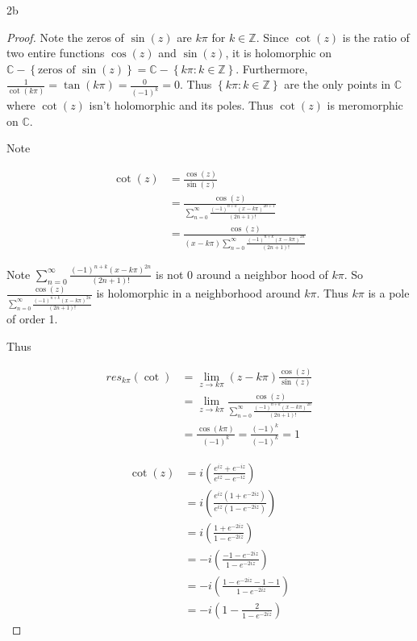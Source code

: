 \documentclass{article}
\newcommand{\C}{\mathbb{C}}
\newcommand{\Z}{\mathbb{Z}}
\begin{document}
\begin{PROB}{2b}\label{Problem 2b.}
\end{PROB}
\begin{proof}
    Note the zeros of $\sin(z)$ are $k \pi$ for $k \in \Z$. Since $\cot(z)$ is the ratio of two entire functions $\cos(z)$ and $\sin(z)$, it is holomorphic on $\C - \left\{ \text{zeros of }  \sin(z)\right\} = \C - \left\{ k \pi : k \in \Z \right\}$. Furthermore, $\frac{1}{\cot(k \pi)} = \tan(k \pi) = \frac{0}{(-1)^k} = 0$. Thus $\left\{ k \pi : k \in \Z \right\}$ are the only points in $\C$  where $\cot(z)$ isn't holomorphic and its poles. Thus $\cot(z)$ is meromorphic on $\C$. 
    
    Note 

    \begin{align*}
        \cot(z) &= \frac{\cos(z)}{\sin(z)} \\
        &=  \frac{\cos(z)}{\sum_{n = 0}^{\infty} \frac{(-1)^{n + k}(x - k \pi)^{2n + 1}}{(2n + 1)!}} \\
        &= \frac{\cos(z)}{(x - k \pi) \sum_{n = 0}^{\infty} \frac{(-1)^{n + k}(x - k \pi)^{2n}}{(2n + 1)!}} 
    \end{align*}

    Note $\sum_{n = 0}^{\infty} \frac{(-1)^{n + k}(x - k \pi)^{2n}}{(2n + 1)!}$ is not 0 around a neighbor hood of $k \pi$. So $\frac{\cos(z)}{\sum_{n = 0}^{\infty} \frac{(-1)^{n + k}(x - k \pi)^{2n}}{(2n + 1)!}}$ is holomorphic in a neighborhood around $k \pi$.   Thus $k \pi$ is a pole of order 1.
    
    Thus 

    \begin{align*}
        res_{k \pi}(\cot) &= \lim_{z \to k \pi}(z - k \pi)\frac{\cos(z)}{\sin(z)} \\
        &= \lim_{z \to k \pi} \frac{\cos(z)}{\sum_{n = 0}^{\infty} \frac{(-1)^{n + k}(x - k \pi)^{2n}}{(2n + 1)!}} \\
        &= \frac{\cos(k \pi)}{(-1)^k} = \frac{(-1)^k}{(-1)^k} = 1
    \end{align*}


    \begin{align*}
        \cot(z) &= i\left(\frac{e^{i z} + e^{-iz}}{e^{iz} - e^{-iz}}\right) \\
        &= i\left(\frac{e^{iz}(1 + e^{-2iz})}{e^{iz}(1 - e^{-2iz})}\right) \\
        &=i\left(\frac{1 + e^{-2iz}}{1 - e^{-2iz}}\right) \\ 
        &= -i\left(\frac{-1 - e^{-2iz}}{1 - e^{-2iz}}\right) \\
        &= -i\left(\frac{1 - e^{-2iz} - 1 - 1}{1 - e^{-2iz}}\right) \\
        &= -i\left(1 - \frac{2}{1 - e^{-2 iz}}\right)
    \end{align*}
\end{proof}
\end{document}
